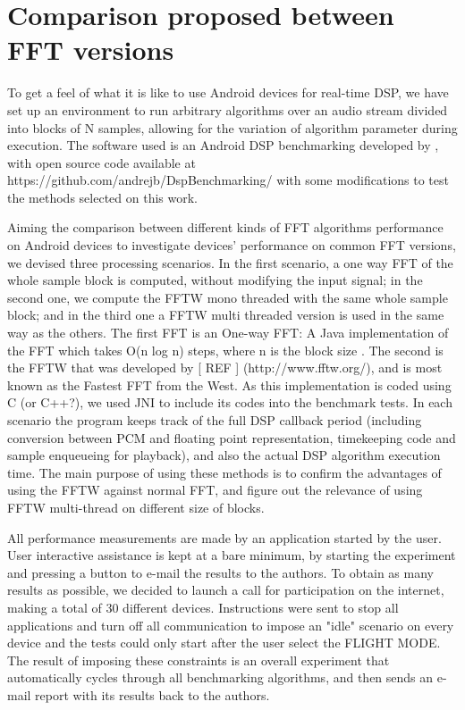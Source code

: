 \documentclass[12pt]{article}
\begin{document}
\section{Comparison proposed between FFT versions}

To  get a feel of what it is like to use Android devices for real-time DSP, we
have set up an environment to run arbitrary algorithms over an audio stream
divided into blocks of N samples, allowing for the variation of algorithm
parameter during execution. The software used is an Android DSP benchmarking
developed by \cite{ajbmqzSMC2012}, with  open source code available at
https://github.com/andrejb/DspBenchmarking/ with some modifications to test
the methods selected on this work.

Aiming  the comparison between different kinds of FFT algorithms performance
on  Android devices to investigate devices' performance on common FFT
versions, we devised three processing scenarios. In the first scenario, a  one
way FFT of the whole sample block is computed, without modifying  the input
signal; in the second one, we compute the FFTW mono threaded  with the same
whole sample block; and in the third one a FFTW multi  threaded version is
used in the same way as the others. The first FFT is  an One-way FFT: A Java
implementation of the FFT which takes O(n log n)  steps, where n is the block
size \citep{CooleyTukey}. The second is the FFTW  that was developed by [ REF
] (http://www.fftw.org/),  and is most known as the Fastest FFT from the West.
As this  implementation is coded using C (or C++?), we used JNI to include its
codes into the benchmark tests. In each scenario the program keeps track  of
the full DSP callback period (including conversion between PCM and  floating
point representation, timekeeping code and sample enqueueing  for playback),
and also the actual DSP algorithm execution time. The  main purpose of using
these methods is to confirm the advantages of  using the FFTW against normal
FFT, and figure out the relevance of using  FFTW multi-thread on different
size of blocks.

All  performance measurements are made by an application started by the  user.
User interactive assistance is kept at a bare minimum, by starting  the
experiment and pressing a button to e-mail the results to the  authors. To
obtain as many results as possible, we decided to launch a  call for
participation on the internet, making a total of 30 different  devices.
Instructions were sent to stop all applications and turn off  all
communication to impose an  "idle" scenario on every device and the tests
could only start after  the user select the FLIGHT MODE. The result of
imposing these  constraints is an overall experiment that automatically cycles
through  all benchmarking algorithms, and then sends an e-mail report with its
results back to the authors.
\end{document}
